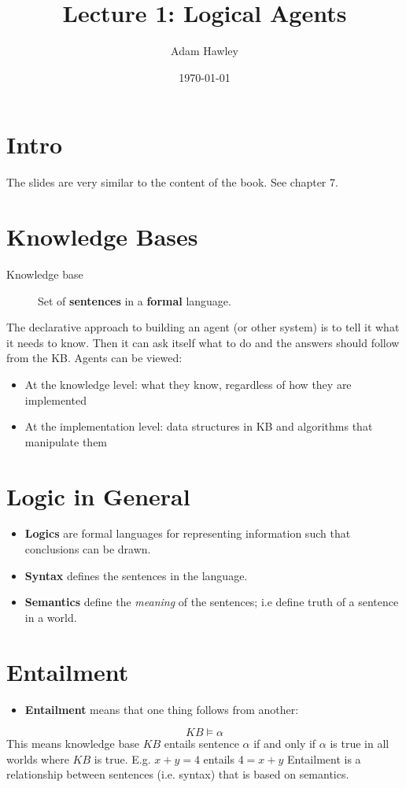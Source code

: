 \documentclass[11pt]{article}
\author{Adam Hawley}
\date{\today}
\title{Lecture 1: Logical Agents}
\begin{document}
\maketitle
\tableofcontents


\section{Intro}
\label{sec:org8ac8ab8}
The slides are very similar to the content of the book.
See chapter 7.

\section{Knowledge Bases}
\label{sec:org21b6bcd}
\begin{description}
\item[{Knowledge base}] Set of \textbf{sentences} in a \textbf{formal} language.
\end{description}
The declarative approach to building an agent (or other system) is to tell it what it needs to know.
Then it can ask itself what to do and the answers should follow from the KB.
Agents can be viewed:
\begin{itemize}
\item At the knowledge level: what they know, regardless of how they are implemented
\item At the implementation level: data structures in KB and algorithms that manipulate them
\end{itemize}

\section{Logic in General}
\label{sec:org687c359}
\begin{itemize}
\item \textbf{Logics} are formal languages for representing information such that conclusions can be drawn.
\item \textbf{Syntax} defines the sentences in the language.
\item \textbf{Semantics} define the \emph{meaning} of the sentences; i.e define truth of a sentence in a world.
\end{itemize}

\section{Entailment}
\label{sec:org34b83f8}
\begin{itemize}
\item \textbf{Entailment} means that one thing follows from another:
\end{itemize}
\begin{equation}
KB \models \alpha
\end{equation}
This means knowledge base \(KB\) entails sentence \(\alpha\) if and only if \(\alpha\) is true in all worlds where \(KB\) is true.
E.g. \(x + y = 4\) entails \(4 = x + y\)
Entailment is a relationship between sentences (i.e. syntax) that is based on semantics.
\end{document}
